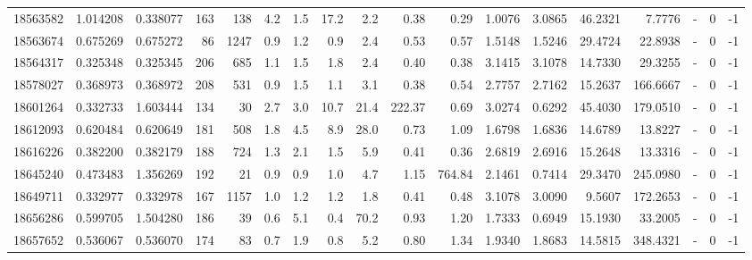 \begin{tabular}{rrrrrrrrrrrrrrrlrr}
  18563582 & 1.014208 &   0.338077 &  163 &  138 &      4.2 &      1.5 &    17.2 &      2.2 &       0.38 &        0.29 &  1.0076 &  3.0865 &   46.2321 &    7.7776 &             - &        0 &         -1 \\
  18563674 & 0.675269 &   0.675272 &   86 & 1247 &      0.9 &      1.2 &     0.9 &      2.4 &       0.53 &        0.57 &  1.5148 &  1.5246 &   29.4724 &   22.8938 &             - &        0 &         -1 \\
  18564317 & 0.325348 &   0.325345 &  206 &  685 &      1.1 &      1.5 &     1.8 &      2.4 &       0.40 &        0.38 &  3.1415 &  3.1078 &   14.7330 &   29.3255 &             - &        0 &         -1 \\
  18578027 & 0.368973 &   0.368972 &  208 &  531 &      0.9 &      1.5 &     1.1 &      3.1 &       0.38 &        0.54 &  2.7757 &  2.7162 &   15.2637 &  166.6667 &             - &        0 &         -1 \\
  18601264 & 0.332733 &   1.603444 &  134 &   30 &      2.7 &      3.0 &    10.7 &     21.4 &     222.37 &        0.69 &  3.0274 &  0.6292 &   45.4030 &  179.0510 &             - &        0 &         -1 \\
  18612093 & 0.620484 &   0.620649 &  181 &  508 &      1.8 &      4.5 &     8.9 &     28.0 &       0.73 &        1.09 &  1.6798 &  1.6836 &   14.6789 &   13.8227 &             - &        0 &         -1 \\
  18616226 & 0.382200 &   0.382179 &  188 &  724 &      1.3 &      2.1 &     1.5 &      5.9 &       0.41 &        0.36 &  2.6819 &  2.6916 &   15.2648 &   13.3316 &             - &        0 &         -1 \\
  18645240 & 0.473483 &   1.356269 &  192 &   21 &      0.9 &      0.9 &     1.0 &      4.7 &       1.15 &      764.84 &  2.1461 &  0.7414 &   29.3470 &  245.0980 &             - &        0 &         -1 \\
  18649711 & 0.332977 &   0.332978 &  167 & 1157 &      1.0 &      1.2 &     1.2 &      1.8 &       0.41 &        0.48 &  3.1078 &  3.0090 &    9.5607 &  172.2653 &             - &        0 &         -1 \\
  18656286 & 0.599705 &   1.504280 &  186 &   39 &      0.6 &      5.1 &     0.4 &     70.2 &       0.93 &        1.20 &  1.7333 &  0.6949 &   15.1930 &   33.2005 &             - &        0 &         -1 \\
  18657652 & 0.536067 &   0.536070 &  174 &   83 &      0.7 &      1.9 &     0.8 &      5.2 &       0.80 &        1.34 &  1.9340 &  1.8683 &   14.5815 &  348.4321 &             - &        0 &         -1 \\

\end{tabular}
